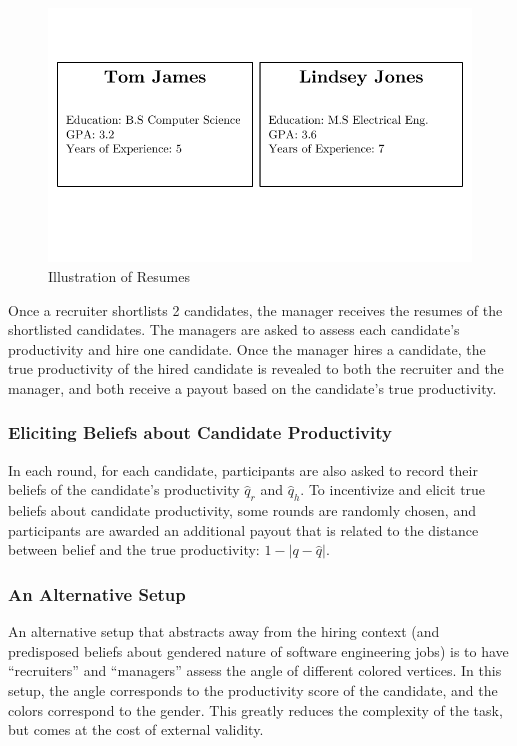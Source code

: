 \documentclass[11pt]{article}
\begin{document}
\begin{figure} %
    \centering
    \includegraphics[width=\textwidth, keepaspectratio]{illus/resumes.pdf}
    \caption{Illustration of Resumes}
    \label{sample_resumes}
\end{figure}

Once a recruiter shortlists 2 candidates, the manager receives the resumes of the shortlisted candidates. The managers are asked to assess each candidate's productivity and hire one candidate. Once the manager hires a candidate, the true productivity of the hired candidate is revealed to both the recruiter and the manager, and both receive a payout based on the candidate's true productivity.

\subsubsection*{Eliciting Beliefs about Candidate Productivity}

In each round, for each candidate, participants are also asked to record their beliefs of the candidate's productivity $\hat{q}_r$ and $\hat{q}_h$. To incentivize and elicit true beliefs about candidate productivity, some rounds are randomly chosen, and participants are awarded an additional payout that is related to the distance between belief and the true productivity: $1-|q - \hat{q}|$.

\subsubsection*{An Alternative Setup}

An alternative setup that abstracts away from the hiring context (and predisposed beliefs about gendered nature of software engineering jobs) is to have ``recruiters'' and ``managers'' assess the angle of different colored vertices. In this setup, the angle corresponds to the productivity score of the candidate, and the colors correspond to the gender. This greatly reduces the complexity of the task, but comes at the cost of external validity.
\end{document}
